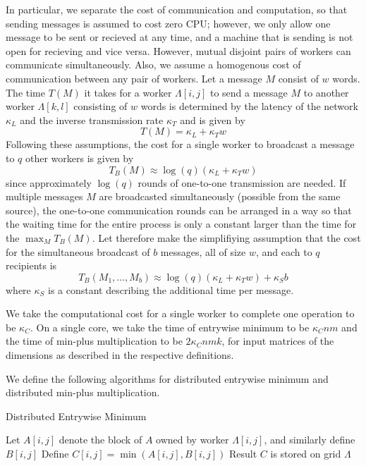 \documentclass{article} %
\begin{document}
In particular, we separate the cost of communication and computation,
so that sending messages is assumed to cost zero CPU; however, we only
allow one message to be sent or recieved at any time, and a machine
that is sending is not open for recieving and vice versa.  However,
mutual disjoint pairs of workers can communicate simultaneously.
Also, we assume a homogenous cost of communication between any pair of
workers.  Let a message $M$ consist of $w$ words.  The time $T(M)$ it
takes for a worker $\Lambda[i,j]$ to send a message $M$ to another
worker $\Lambda[k,l]$ consisting of $w$ words is determined by the
latency of the network $\kappa_L$ and the inverse transmission rate
$\kappa_T$ and is given by
\[
T(M) = \kappa_L + \kappa_T w
\]
Following these assumptions, the cost for a single worker to broadcast
a message to $q$ other workers is given by
\[
T_B(M) \approx \log(q) (\kappa_L + \kappa_T w) 
\]
since approximately $\log(q)$ rounds of one-to-one transmission are
needed.  If multiple messages $M$ are broadcasted simultaneously
(possible from the same source), the one-to-one communication rounds
can be arranged in a way so that the waiting time for the entire
process is only a constant larger than the time for the $\max_M
T_B(M)$.  Let therefore make the simplifiying assumption that the cost
for the simultaneous broadcast of $b$ messages, all of size $w$, and
each to $q$ recipients is
\[
T_B(M_1,\hdots, M_b) \approx \log(q)(\kappa_L + \kappa_T w) + \kappa_S b
\]
where $\kappa_S$ is a constant describing the additional time per
message.

We take the computational cost for a single worker to complete one
operation to be $\kappa_C$.  On a single core, we take the time of
entrywise minimum to be $\kappa_C nm$ and the time of min-plus
multiplication to be $2\kappa_C nmk$, for input matrices of the
dimensions as described in the respective definitions.

We define the following algorithms for distributed entrywise minimum
and distributed min-plus multiplication.

\begin{algorithm}[H]
\caption{Distributed Entrywise Minimum}
\begin{algorithmic}
  \State Let $A[i, j]$ denote the block of $A$ owned by worker $\Lambda[i, j]$, and similarly define $B[i, j]$
    \State Define $C[i, j] = \min(A[i, j], B[i, j])$
  \EndFor
  \State Result $C$ is stored on grid $\Lambda$
\EndFunction
\end{algorithmic}
\end{algorithm}
\end{document}
